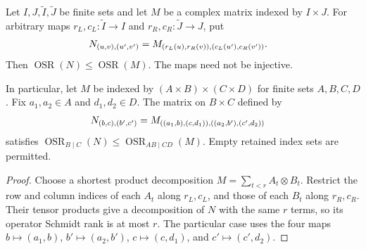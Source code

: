 \begin{theorem}
    \label{thm:operator_schmidt_local_coordinates}
    \leanok
    Let $I,J,\widetilde I,\widetilde J$ be finite sets and let $M$ be a
    complex matrix indexed by $I\times J$. For arbitrary maps
    $r_L,c_L:\widetilde I\to I$ and $r_R,c_R:\widetilde J\to J$, put
    \begin{align}
        N_{(u,v),(u',v')}
         & =M_{(r_L(u),r_R(v)),(c_L(u'),c_R(v'))}. \notag
    \end{align}
    Then $\operatorname{OSR}(N)\le\operatorname{OSR}(M)$.
    The maps need not be injective.

    In particular, let $M$ be indexed by $(A\times B)\times(C\times D)$
    for finite sets $A,B,C,D$. Fix $a_1,a_2\in A$ and $d_1,d_2\in D$.
    The matrix on $B\times C$ defined by
    \begin{align}
        N_{(b,c),(b',c')}
         & =M_{((a_1,b),(c,d_1)),((a_2,b'),(c',d_2))} \notag
    \end{align}
    satisfies
    $\operatorname{OSR}_{B\mid C}(N)
        \le\operatorname{OSR}_{AB\mid CD}(M)$.
    Empty retained index sets are permitted.
\end{theorem}
\begin{proof}\leanok
    Choose a shortest product decomposition
    $M=\sum_{t<r}A_t\otimes B_t$. Restrict the row and column indices
    of each $A_t$ along $r_L,c_L$, and those of each $B_t$ along
    $r_R,c_R$. Their tensor products give a decomposition of $N$
    with the same $r$ terms, so its operator Schmidt rank is at most
    $r$. The particular case uses the four maps
    $b\mapsto(a_1,b)$, $b'\mapsto(a_2,b')$,
    $c\mapsto(c,d_1)$, and $c'\mapsto(c',d_2)$.
\end{proof}

